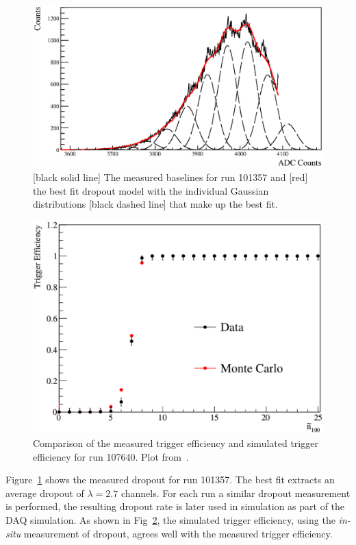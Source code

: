\begin{figure}[htbp]
    \centering
    \includegraphics[width=1\textwidth]{dropout_example}
    \caption[Dropout Fit Example]{[black solid line] The measured baselines
    for run 101357 and [red] the best fit dropout model with the
    individual Gaussian distributions [black dashed line] that make up the best fit.}
\label{fig:dropoutexample}
\end{figure}

\begin{figure}[htbp]
    \centering
    \includegraphics[width=1\textwidth]{trigger_efficiecy}
    \caption[Trigger Efficiency] {Comparison of the measured trigger efficiency
    and simulated trigger efficiency for run 107640. Plot from~\citep{tanner_triggeff}.}
\label{fig:trigeff}
\end{figure}

Figure~\ref{fig:dropoutexample} shows the measured dropout for run 101357.
The best fit extracts an average dropout of $\lambda=2.7$ channels.
For each run a similar dropout measurement is performed, the resulting dropout
rate is later used in simulation as part of the DAQ simulation.
As shown in Fig~\ref{fig:trigeff}, the  simulated trigger efficiency, using the
\textit{in-situ} measurement of dropout, agrees well with the measured trigger
efficiency.

